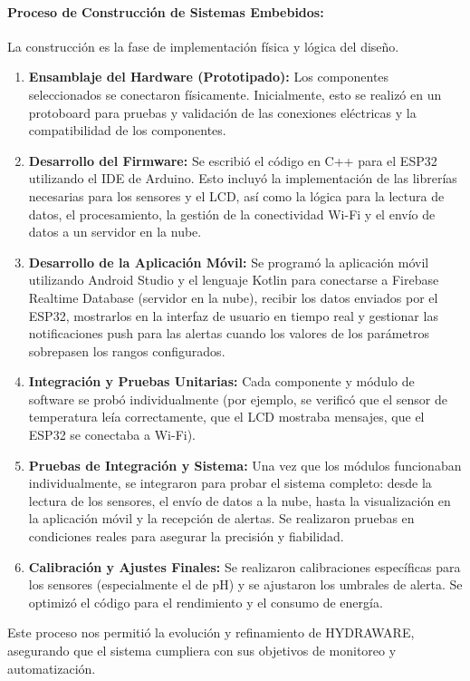 \documentclass[a4paper,12pt]{article}
\begin{document}
	\paragraph{Proceso de Construcción de Sistemas Embebidos:}
	La construcción es la fase de implementación física y lógica del diseño.
	\begin{enumerate}
		\item \textbf{Ensamblaje del Hardware (Prototipado):} Los componentes seleccionados se conectaron físicamente. Inicialmente, esto se realizó en un protoboard para pruebas y validación de las conexiones eléctricas y la compatibilidad de los componentes.
		\item \textbf{Desarrollo del Firmware:} Se escribió el código en C++ para el ESP32 utilizando el IDE de Arduino. Esto incluyó la implementación de las librerías necesarias para los sensores y el LCD, así como la lógica para la lectura de datos, el procesamiento, la gestión de la conectividad Wi-Fi y el envío de datos a un servidor en la nube.
		\item \textbf{Desarrollo de la Aplicación Móvil:} Se programó la aplicación móvil utilizando Android Studio y el lenguaje Kotlin para conectarse a Firebase Realtime Database (servidor en la nube), recibir los datos enviados por el ESP32, mostrarlos en la interfaz de usuario en tiempo real y gestionar las notificaciones push para las alertas cuando los valores de los parámetros sobrepasen los rangos configurados.
		\item \textbf{Integración y Pruebas Unitarias:} Cada componente y módulo de software se probó individualmente (por ejemplo, se verificó que el sensor de temperatura leía correctamente, que el LCD mostraba mensajes, que el ESP32 se conectaba a Wi-Fi).
		\item \textbf{Pruebas de Integración y Sistema:} Una vez que los módulos funcionaban individualmente, se integraron para probar el sistema completo: desde la lectura de los sensores, el envío de datos a la nube, hasta la visualización en la aplicación móvil y la recepción de alertas. Se realizaron pruebas en condiciones reales para asegurar la precisión y fiabilidad.
		\item \textbf{Calibración y Ajustes Finales:} Se realizaron calibraciones específicas para los sensores (especialmente el de pH) y se ajustaron los umbrales de alerta. Se optimizó el código para el rendimiento y el consumo de energía.
	\end{enumerate}
	Este proceso nos permitió la evolución y refinamiento de HYDRAWARE, asegurando que el sistema cumpliera con sus objetivos de monitoreo y automatización.
	
\end{document}
